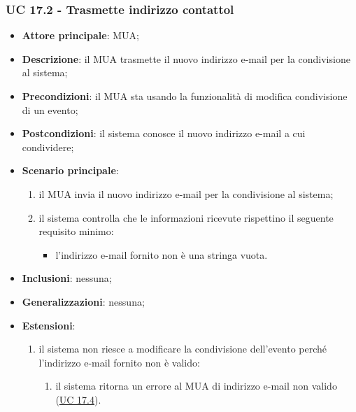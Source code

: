     \subsubsection{UC 17.2 - Trasmette indirizzo contattol} \label{sec:UC17.2}
    \begin{itemize}
        \item \textbf{Attore principale}: MUA;
        \item \textbf{Descrizione}: il MUA trasmette il nuovo indirizzo e-mail per la condivisione al sistema;
        \item \textbf{Precondizioni}: il MUA sta usando la funzionalità di modifica condivisione di un evento;
        \item \textbf{Postcondizioni}: il sistema conosce il nuovo indirizzo e-mail a cui condividere;
        \item \textbf{Scenario principale}:
            \begin{enumerate}
                \item il MUA invia il nuovo indirizzo e-mail per la condivisione al sistema;
                \item il sistema controlla che le informazioni ricevute rispettino il seguente requisito minimo:
                    \begin{itemize}
                        \item l'indirizzo e-mail fornito non è una stringa vuota.
                    \end{itemize}
            \end{enumerate}
        \item \textbf{Inclusioni}: nessuna;
        \item \textbf{Generalizzazioni}: nessuna;
        \item \textbf{Estensioni}:
            \begin{enumerate}[label=\alph*.]
                \item il sistema non riesce a modificare la condivisione dell'evento perché l'indirizzo e-mail fornito non è valido:
                \begin{enumerate}[label=\arabic*.]
                    \item il sistema ritorna un errore al MUA di indirizzo e-mail non valido (\hyperref[sec:UC17.4]{UC 17.4}).
                \end{enumerate}
            \end{enumerate}
    \end{itemize}



